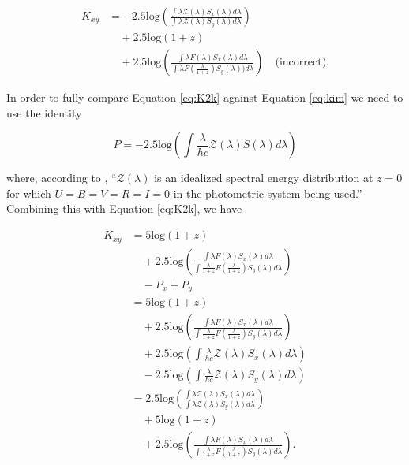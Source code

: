 \documentclass[aps,prl,reprint,amsmath,floatfix]{revtex4-2}
\begin{document}
\begin{equation}
\begin{aligned}
\label{eq:kim}
  K_{xy} &=
    -2.5\text{log} \left(
      \frac{\int \lambda \mathcal{Z}(\lambda)S_x(\lambda)d\lambda}
           {\int \lambda \mathcal{Z}(\lambda)S_y(\lambda)d\lambda}\right) \\
    &\quad + 2.5\text{log}(1+z) \\
    &\quad + 2.5\text{log}\left(
      \frac{\int \lambda F(\lambda)S_x(\lambda)d\lambda}
           {\int \lambda F\left(\frac{\lambda}{1+z}\right)S_y(\lambda))d\lambda}\right) \quad \text{(incorrect)}.
\end{aligned}
\end{equation}

In order to fully compare Equation \ref{eq:K2k} against Equation \ref{eq:kim} we need to use the identity

\begin{equation}
  P = -2.5 \text{log} \left( \int \frac{\lambda}{hc} \mathcal{Z}(\lambda) S(\lambda) d\lambda \right)
\end{equation}

\noindent where, according to \citet{kim1996}, ``$\mathcal{Z}(\lambda)$ is an
idealized spectral energy distribution at $z = 0$ for which
$U = B = V = R = I = 0$ in the photometric system being used.'' Combining this
with Equation \ref{eq:K2k}, we have

\begin{equation}
\begin{aligned}
  K_{xy} &= 5 \text{log} (1 + z) \\
         &\quad + 2.5 \text{log} \left(
              \frac{\int \lambda F(\lambda) S_x(\lambda) d\lambda}
                   {\int \frac{\lambda}{1+z} F\left(\frac{\lambda}{1+z}\right) S_y(\lambda) d\lambda} \right) \\
         &\quad - P_x + P_y \\
         &= 5 \text{log} (1 + z) \\
         &\quad + 2.5 \text{log} \left(
              \frac{\int \lambda F(\lambda) S_x(\lambda) d\lambda}
                   {\int \frac{\lambda}{1+z} F\left(\frac{\lambda}{1+z}\right) S_y(\lambda) d\lambda} \right) \\
         &\quad + 2.5 \text{log} \left( \int \frac{\lambda}{hc} \mathcal{Z}(\lambda) S_x(\lambda) d\lambda \right) \\
         &\quad - 2.5 \text{log} \left( \int \frac{\lambda}{hc} \mathcal{Z}(\lambda) S_y(\lambda) d\lambda \right) \\
         &= 2.5 \text{log} \left(
              \frac{\int \lambda \mathcal{Z}(\lambda) S_x(\lambda) d\lambda}
                   {\int \lambda \mathcal{Z}(\lambda) S_y(\lambda) d\lambda}
             \right) \\
         &\quad + 5 \text{log} (1 + z) \\
         &\quad + 2.5 \text{log} \left(
              \frac{\int \lambda F(\lambda) S_x(\lambda) d\lambda}
                   {\int \frac{\lambda}{1+z} F\left(\frac{\lambda}{1+z}\right) S_y(\lambda) d\lambda} \right) .
\end{aligned}
\end{equation}
\end{document}
